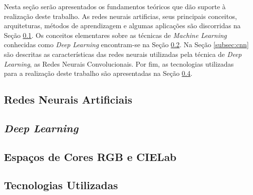 Nesta seção serão apresentados os fundamentos teóricos que dão suporte à realização deste trabalho. As redes neurais artificias, seus principais conceitos, arquiteturas, métodos de aprendizagem e algumas aplicações são discorridas na Seção \ref{subsec:rna}. Os conceitos elementares sobre as técnicas de \textit{Machine Learning} conhecidas como \textit{Deep Learning} encontram-se na Seção \ref{subsec:deep}. Na Seção \ref{subsec:cnn} são descritas as características das redes neurais utilizadas pela técnica de \textit{Deep Learning}, as Redes Neurais Convolucionais. Por fim, as tecnologias utilizadas para a realização deste trabalho são apresentadas na Seção \ref{subsec:tecnologias}.

\subsection{Redes Neurais Artificiais} \label{subsec:rna}


\subsection{\textit{Deep Learning}} \label{subsec:deep}


\subsection{Espaços de Cores RGB e CIELab} \label{subsec:cores}


\subsection{Tecnologias Utilizadas} \label{subsec:tecnologias}

